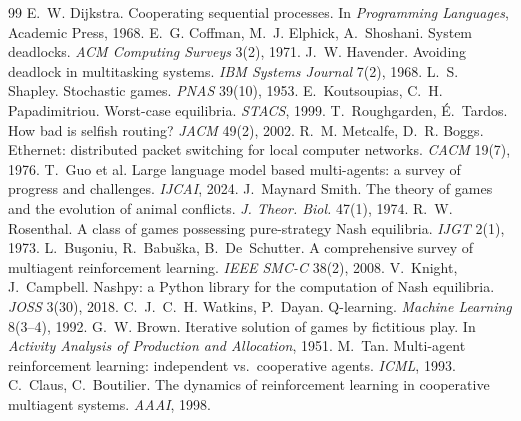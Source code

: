 \documentclass[10pt]{article}
\begin{document}
\begin{thebibliography}{99}\small\setlength{\itemsep}{0pt}
 E.~W. Dijkstra. Cooperating sequential processes. In \emph{Programming Languages}, Academic Press, 1968.
 E.~G. Coffman, M.~J. Elphick, A.~Shoshani. System deadlocks. \emph{ACM Computing Surveys} 3(2), 1971.
 J.~W. Havender. Avoiding deadlock in multitasking systems. \emph{IBM Systems Journal} 7(2), 1968.
 L.~S. Shapley. Stochastic games. \emph{PNAS} 39(10), 1953.
 E.~Koutsoupias, C.~H. Papadimitriou. Worst-case equilibria. \emph{STACS}, 1999.
 T.~Roughgarden, \'E.~Tardos. How bad is selfish routing? \emph{JACM} 49(2), 2002.
 R.~M. Metcalfe, D.~R. Boggs. Ethernet: distributed packet switching for local computer networks. \emph{CACM} 19(7), 1976.
 T.~Guo et al. Large language model based multi-agents: a survey of progress and challenges. \emph{IJCAI}, 2024.
 J.~Maynard Smith. The theory of games and the evolution of animal conflicts. \emph{J. Theor. Biol.} 47(1), 1974.
 R.~W. Rosenthal. A class of games possessing pure-strategy Nash equilibria. \emph{IJGT} 2(1), 1973.
 L.~Bu\c{s}oniu, R.~Babu\v{s}ka, B.~De~Schutter. A comprehensive survey of multiagent reinforcement learning. \emph{IEEE SMC-C} 38(2), 2008.
 V.~Knight, J.~Campbell. Nashpy: a Python library for the computation of Nash equilibria. \emph{JOSS} 3(30), 2018.
 C.~J.~C.~H. Watkins, P.~Dayan. Q-learning. \emph{Machine Learning} 8(3--4), 1992.
 G.~W. Brown. Iterative solution of games by fictitious play. In \emph{Activity Analysis of Production and Allocation}, 1951.
 M.~Tan. Multi-agent reinforcement learning: independent vs.\ cooperative agents. \emph{ICML}, 1993.
 C.~Claus, C.~Boutilier. The dynamics of reinforcement learning in cooperative multiagent systems. \emph{AAAI}, 1998.
\end{thebibliography}
\end{document}
